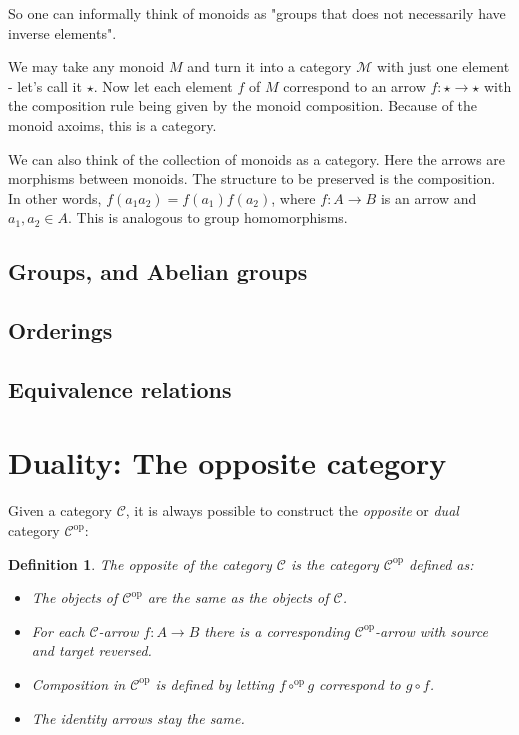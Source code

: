 \documentclass[12pt, a4paper]{article}
\newtheorem{definition}{Definition}[section]
\numberwithin{equation}{section}
\begin{document}
So one can informally think of monoids as "groups that does not necessarily have inverse elements".

We may take any monoid $M$ and turn it into a category $\mathcal{M}$ with just one element - let's call it $\star$. Now let each element $f$ of $M$ correspond to an arrow $f:\star\rightarrow\star$ with the composition rule being given by the monoid composition. Because of the monoid axoims, this is a category.

We can also think of the collection of monoids as a category. Here the arrows are morphisms between monoids. The structure to be preserved is the composition. In other words, $f(a_1a_2)=f(a_1)f(a_2)$, where $f: A\rightarrow B$ is an arrow and $a_1,a_2\in A$. This is analogous to group homomorphisms.

\subsection{Groups, and Abelian groups}

\subsection{Orderings}

\subsection{Equivalence relations}

\section{Duality: The opposite category}
Given a category $\mathcal{C}$, it is always possible to construct the \textit{opposite} or \textit{dual} category $\mathcal{C}^{\textrm{op}}$:

\begin{definition}
The opposite of the category $\mathcal{C}$ is the category $\mathcal{C}^{\textrm{op}}$ defined as:
\begin{itemize}
\item The objects of $\mathcal{C}^{\textrm{op}}$ are the same as the objects of $\mathcal{C}$.
\item For each $\mathcal{C}$-arrow $f: A\rightarrow B$ there is a corresponding $\mathcal{C}^{\textrm{op}}$-arrow with source and target reversed.
\item Composition in $\mathcal{C}^{\textrm{op}}$ is defined by letting $f\circ^{\textrm{op}}g$ correspond to $g\circ f$.
\item The identity arrows stay the same.
\end{itemize}
\end{definition}
\end{document}
